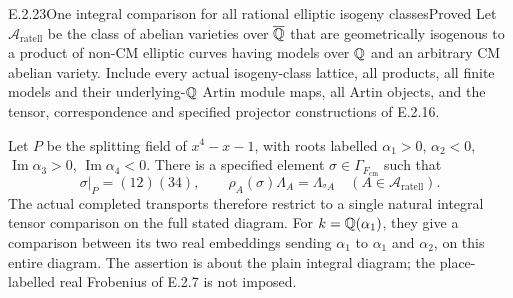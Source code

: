 \begin{result}{E.2.23}{One integral comparison for all rational elliptic isogeny classes}{Proved}
Let \(\mathcal A_{\mathrm{ratell}}\) be the class of abelian
varieties over \(\overline{\mathbb Q}\) that are geometrically isogenous to a
product of non-CM elliptic curves having models over \(\mathbb Q\)
and an arbitrary CM abelian variety. Include every actual
isogeny-class lattice, all products, all finite models and their
underlying-\(\mathbb Q\) Artin module maps, all Artin objects, and
the tensor, correspondence and specified projector constructions
of E.2.16.

Let \(P\) be the splitting field of \(x^4-x-1\), with roots
labelled \(\alpha_1>0\), \(\alpha_2<0\),
\(\operatorname{Im}\alpha_3>0\),
\(\operatorname{Im}\alpha_4<0\). There is a specified element
\(\sigma\in\Gamma_{F_{\mathrm{cm}}}\) such that
\[
 \sigma|_P=(12)(34),\qquad
 \rho_A(\sigma)\Lambda_A=\Lambda_{{}^{\sigma}A}
       \quad(A\in\mathcal A_{\mathrm{ratell}}).
 \tag{E.2.23a}
\]
The actual completed transports therefore restrict to a single
natural integral tensor comparison on the full stated diagram.
For \(k=\mathbb Q(\alpha_1)\), they give a comparison between its
two real embeddings sending \(\alpha_1\) to
\(\alpha_1\) and \(\alpha_2\), on this entire diagram.
The assertion is about the plain integral diagram; the
place-labelled real Frobenius of E.2.7 is not imposed.
\end{result}
